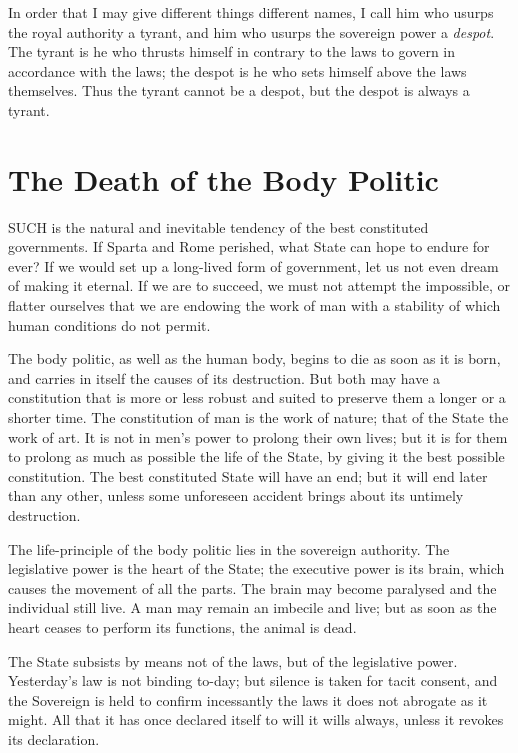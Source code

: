 \documentclass[12pt]{book}
\begin{document}
In order that I may give different things different names, I call him who usurps the royal authority a tyrant, and him who usurps the sovereign power a \textit{despot}. The tyrant is he who thrusts himself in contrary to the laws to govern in accordance with the laws; the despot is he who sets himself above the laws themselves. Thus the tyrant cannot be a despot, but the despot is always a tyrant.

\section{The Death of the Body Politic}
SUCH is the natural and inevitable tendency of the best constituted governments. If Sparta and Rome perished, what State can hope to endure for ever? If we would set up a long-lived form of government, let us not even dream of making it eternal. If we are to succeed, we must not attempt the impossible, or flatter ourselves that we are endowing the work of man with a stability of which human conditions do not permit.

The body politic, as well as the human body, begins to die as soon as it is born, and carries in itself the causes of its destruction. But both may have a constitution that is more or less robust and suited to preserve them a longer or a shorter time. The constitution of man is the work of nature; that of the State the work of art. It is not in men's power to prolong their own lives; but it is for them to prolong as much as possible the life of the State, by giving it the best possible constitution. The best constituted State will have an end; but it will end later than any other, unless some unforeseen accident brings about its untimely destruction.

The life-principle of the body politic lies in the sovereign authority. The legislative power is the heart of the State; the executive power is its brain, which causes the movement of all the parts. The brain may become paralysed and the individual still live. A man may remain an imbecile and live; but as soon as the heart ceases to perform its functions, the animal is dead.

The State subsists by means not of the laws, but of the legislative power. Yesterday's law is not binding to-day; but silence is taken for tacit consent, and the Sovereign is held to confirm incessantly the laws it does not abrogate as it might. All that it has once declared itself to will it wills always, unless it revokes its declaration.
\end{document}
